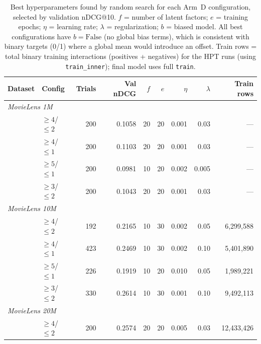 \begin{table}[ht]
\centering
\caption{Best hyperparameters found by random search for each Arm~D
  configuration, selected by validation nDCG@10.
  $f$ = number of latent factors; $e$ = training epochs;
  $\eta$ = learning rate; $\lambda$ = regularization; $b$ = biased model.
  All best configurations have $b\!=\!\text{False}$ (no global bias terms),
  which is consistent with binary targets (0/1) where a global mean would
  introduce an offset.
  Train rows = total binary training interactions (positives + negatives)
  for the HPT runs (using \texttt{train\_inner}); final model uses full \texttt{train}.}
\label{tab:hpt_arm_d}
\begin{tabular}{llrrrrrrr}
\toprule
Dataset       & Config          & Trials & Val nDCG & $f$ & $e$ & $\eta$ & $\lambda$ & Train rows \\
\midrule
\multicolumn{9}{l}{\textit{MovieLens 1M}} \\
              & ${\geq}4$/${\leq}2$ & 200 & 0.1058 & 20  & 20 & 0.001 & 0.03 & --- \\
              & ${\geq}4$/${\leq}1$ & 200 & 0.1103 & 20  & 20 & 0.001 & 0.03 & --- \\
              & ${\geq}5$/${\leq}1$ & 200 & 0.0981 & 10  & 20 & 0.002 & 0.005 & --- \\
              & ${\geq}3$/${\leq}2$ & 200 & 0.1043 & 20  & 20 & 0.001 & 0.03 & --- \\
\midrule
\multicolumn{9}{l}{\textit{MovieLens 10M}} \\
              & ${\geq}4$/${\leq}2$ & 192 & 0.2165 & 10  & 30 & 0.002 & 0.05  & 6{,}299{,}588 \\
              & ${\geq}4$/${\leq}1$ & 423 & 0.2469 & 10  & 30 & 0.002 & 0.10  & 5{,}401{,}890 \\
              & ${\geq}5$/${\leq}1$ & 226 & 0.1919 & 10  & 20 & 0.010 & 0.05  & 1{,}989{,}221 \\
              & ${\geq}3$/${\leq}2$ & 330 & 0.2614 & 10  & 30 & 0.001 & 0.10  & 9{,}492{,}113 \\
\midrule
\multicolumn{9}{l}{\textit{MovieLens 20M}} \\
              & ${\geq}4$/${\leq}2$ & 200 & 0.2574 & 20  & 20 & 0.005 & 0.03  & 12{,}433{,}426 \\

\end{tabular}
\end{table}

